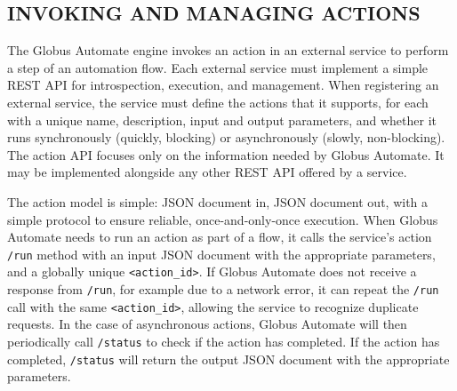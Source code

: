 \documentclass{aip-cp}
\newcommand\code[1]{{\tt \footnotesize #1}}
\newcommand\bluecode[1]{\code{#1}}
\newcommand\darkcode[1]{\code{#1}}
\begin{document}
\subsection{INVOKING AND MANAGING ACTIONS}
The Globus Automate engine invokes an action in an external service to 
perform a step of an automation flow. Each external service must implement a
simple REST API for introspection, execution, and management. 
When registering an external service, the service must 
define the actions that it supports, for each with
a unique name, description, input and output parameters, 
and whether it runs synchronously (quickly, blocking)
or asynchronously (slowly, non-blocking).
The action API focuses only on the information 
needed by Globus Automate.
It may be implemented alongside any other REST API offered by a service.

%

The action model is simple: JSON document in, JSON document out, with a simple protocol to ensure 
reliable, once-and-only-once execution.
When Globus Automate needs to run an action as part of a flow, it calls the service's action 
\darkcode{/run} method with an input JSON document with the appropriate parameters, and a globally 
unique \code{<action\_id>}.  
If Globus Automate does not receive a response from \darkcode{/run}, for example due to a network 
error, 
it can repeat the \darkcode{/run} call with the same \code{<action\_id>}, allowing the service to 
recognize duplicate requests.  
In the case of asynchronous actions, Globus Automate will then periodically call \darkcode{/status} 
to check if the action  has completed. 
If the action has completed, \darkcode{/status} will return the output JSON document with the 
appropriate parameters.  
 
\end{document}
